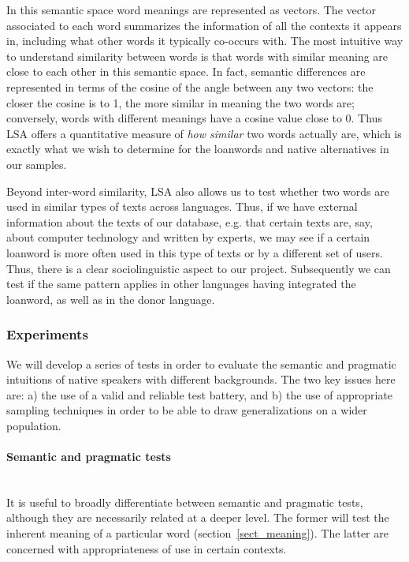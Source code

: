 \documentclass[a4paper]{article}
\begin{document}
In this semantic space word meanings are represented as vectors.
The vector associated to each word summarizes the information of all the contexts it appears in, including what other words it typically co-occurs with.
The most intuitive way to understand similarity between words is that words with similar meaning are close to each other in this semantic space.
In fact, semantic differences are represented in terms of the cosine of the angle between any two vectors: the closer the cosine is to 1, the more similar in meaning the two words are; conversely, words with different meanings have a cosine value close to 0. 
Thus LSA offers a quantitative measure of \emph{how similar} two words actually are, which is exactly what we wish to determine for the loanwords and native alternatives in our samples.

Beyond inter-word similarity, LSA also allows us to test whether two words are used in similar types of texts across languages.
Thus, if we have external information about the texts of our database, e.g. that certain texts are, say, about computer technology and written by experts, we may see if a certain loanword is more often used in this type of texts or by a different set of users. 
Thus, there is a clear sociolinguistic aspect to our project.
Subsequently we can test if the same pattern applies in other languages having integrated the loanword, as well as in the donor language. 

\subsubsection{Experiments}
\label{subsect_experim}

We will develop a series of tests in order to evaluate the semantic and pragmatic intuitions of native speakers with different backgrounds.
The two key issues here are: a) the use of a valid and reliable test battery, and b) the use of appropriate sampling techniques in order to be able to draw generalizations on a wider population.

\paragraph{ Semantic and pragmatic tests}
\hspace{0pt} \\
It is useful to broadly differentiate between semantic and pragmatic tests, although they are necessarily related at a deeper level.
The former will test the inherent meaning of a particular word (section~\ref{sect_meaning}). 
The latter are concerned with appropriateness of use in certain contexts.
\end{document}
